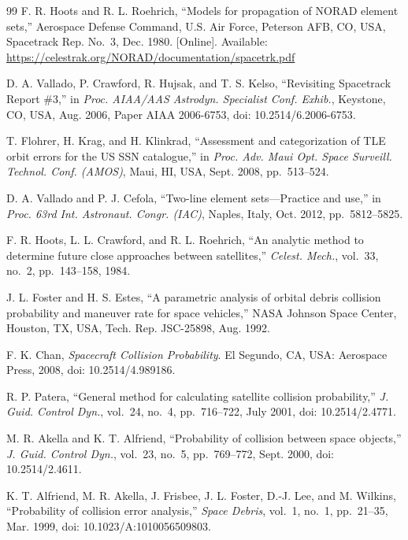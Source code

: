 \documentclass[conference]{IEEEtran}
\begin{document}
\begin{thebibliography}{99}
F. R. Hoots and R. L. Roehrich, ``Models for propagation of NORAD element
sets,'' Aerospace Defense Command, U.S. Air Force, Peterson AFB, CO, USA,
Spacetrack Rep. No.~3, Dec. 1980. [Online]. Available:
\url{https://celestrak.org/NORAD/documentation/spacetrk.pdf}

D. A. Vallado, P. Crawford, R. Hujsak, and T. S. Kelso, ``Revisiting
Spacetrack Report \#3,'' in \emph{Proc. AIAA/AAS Astrodyn. Specialist Conf.
Exhib.}, Keystone, CO, USA, Aug. 2006, Paper AIAA 2006-6753,
doi: 10.2514/6.2006-6753.

T. Flohrer, H. Krag, and H. Klinkrad, ``Assessment and categorization of TLE
orbit errors for the US SSN catalogue,'' in \emph{Proc. Adv. Maui Opt. Space
Surveill. Technol. Conf. (AMOS)}, Maui, HI, USA, Sept. 2008, pp.~513--524.

D. A. Vallado and P. J. Cefola, ``Two-line element sets---Practice and use,''
in \emph{Proc. 63rd Int. Astronaut. Congr. (IAC)}, Naples, Italy, Oct. 2012,
pp.~5812--5825.

F. R. Hoots, L. L. Crawford, and R. L. Roehrich, ``An analytic method to
determine future close approaches between satellites,'' \emph{Celest.
Mech.}, vol.~33, no.~2, pp.~143--158, 1984.

J. L. Foster and H. S. Estes, ``A parametric analysis of orbital debris
collision probability and maneuver rate for space vehicles,'' NASA Johnson
Space Center, Houston, TX, USA, Tech. Rep. JSC-25898, Aug. 1992.

F. K. Chan, \emph{Spacecraft Collision Probability}. El Segundo, CA, USA:
Aerospace Press, 2008, doi: 10.2514/4.989186.

R. P. Patera, ``General method for calculating satellite collision
probability,'' \emph{J. Guid. Control Dyn.}, vol.~24, no.~4, pp.~716--722,
July 2001, doi: 10.2514/2.4771.

M. R. Akella and K. T. Alfriend, ``Probability of collision between space
objects,'' \emph{J. Guid. Control Dyn.}, vol.~23, no.~5, pp.~769--772,
Sept. 2000, doi: 10.2514/2.4611.

K. T. Alfriend, M. R. Akella, J. Frisbee, J. L. Foster, D.-J. Lee, and
M. Wilkins, ``Probability of collision error analysis,'' \emph{Space Debris},
vol.~1, no.~1, pp.~21--35, Mar. 1999, doi: 10.1023/A:1010056509803.


\end{thebibliography}
\end{document}
